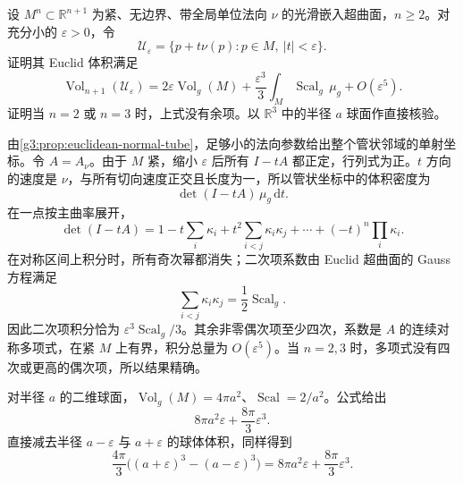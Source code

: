 \begin{exercise}\label{g3:ex:two-sided-tube-volume}
	设 \(M^n\subset\mathbb R^{n+1}\) 为紧、无边界、带全局单位法向 \(\nu\) 的光滑嵌入超曲面，\(n\ge2\)。对充分小的 \(\varepsilon>0\)，令
	\[
		\mathcal U_\varepsilon=\{p+t\nu(p):p\in M,\ |t|<\varepsilon\}.
	\]
	证明其 Euclid 体积满足
	\[
		\operatorname{Vol}_{n+1}(\mathcal U_\varepsilon)
		=2\varepsilon\operatorname{Vol}_g(M)
		+\frac{\varepsilon^3}{3}\int_M\operatorname{Scal}_g\,\mu_g
		+O(\varepsilon^5).
	\]
	证明当 \(n=2\) 或 \(n=3\) 时，上式没有余项。以 \(\mathbb R^3\) 中的半径 \(a\) 球面作直接核验。
\end{exercise}
\begin{solution}
	由\cref{g3:prop:euclidean-normal-tube}，足够小的法向参数给出整个管状邻域的单射坐标。令 \(A=A_\nu\)。由于 \(M\) 紧，缩小 \(\varepsilon\) 后所有 \(I-tA\) 都正定，行列式为正。\(t\) 方向的速度是 \(\nu\)，与所有切向速度正交且长度为一，所以管状坐标中的体积密度为
	\[
		\det(I-tA)\,\mu_g\,\mathrm dt.
	\]
	在一点按主曲率展开，
	\[
		\det(I-tA)=1-t\sum_i\kappa_i
		+t^2\sum_{i<j}\kappa_i\kappa_j+\cdots+(-t)^n\prod_i\kappa_i.
	\]
	在对称区间上积分时，所有奇次幂都消失；二次项系数由 Euclid 超曲面的 Gauss 方程满足
	\[
		\sum_{i<j}\kappa_i\kappa_j
		=\frac12\operatorname{Scal}_g.
	\]
	因此二次项积分恰为 \(\varepsilon^3\operatorname{Scal}_g/3\)。其余非零偶次项至少四次，系数是 \(A\) 的连续对称多项式，在紧 \(M\) 上有界，积分总量为 \(O(\varepsilon^5)\)。当 \(n=2,3\) 时，多项式没有四次或更高的偶次项，所以结果精确。

	对半径 \(a\) 的二维球面，\(\operatorname{Vol}_g(M)=4\pi a^2\)、\(\operatorname{Scal}=2/a^2\)。公式给出
	\[
		8\pi a^2\varepsilon+\frac{8\pi}{3}\varepsilon^3.
	\]
	直接减去半径 \(a-\varepsilon\) 与 \(a+\varepsilon\) 的球体体积，同样得到
	\[
		\frac{4\pi}{3}\bigl((a+\varepsilon)^3-(a-\varepsilon)^3\bigr)
		=8\pi a^2\varepsilon+\frac{8\pi}{3}\varepsilon^3.
	\]
\end{solution}

